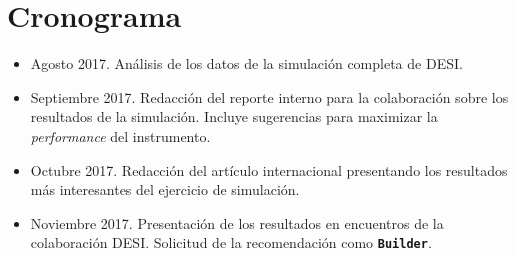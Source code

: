 \documentclass[12pt,spanish]{article}
\begin{document}
\section*{Cronograma}
\begin{itemize}
\item Agosto 2017. An\'alisis de los datos de la simulaci\'on completa
  de DESI. 
\item Septiembre 2017. Redacci\'on del reporte interno para la
  colaboraci\'on sobre los resultados de la simulaci\'on. 
Incluye
  sugerencias para maximizar la \emph{performance} del instrumento. 
\item Octubre 2017. Redacci\'on del art\'iculo internacional
  presentando los resultados m\'as interesantes del ejercicio de
  simulaci\'on. 
\item Noviembre 2017. Presentaci\'on de los resultados en encuentros
  de la colaboraci\'on DESI. Solicitud de la recomendaci\'on como
  \texttt{\bf Builder}.
\end{itemize}
\end{document}
